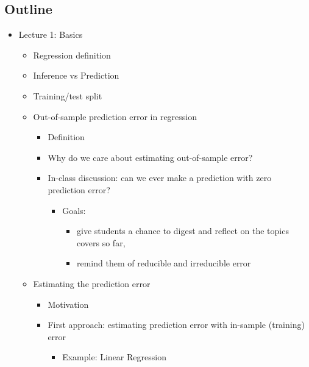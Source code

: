 \documentclass[
  letterpaper,
  DIV=11,
  numbers=noendperiod]{scrartcl}
\providecommand{\tightlist}{%
  \setlength{\itemsep}{0pt}\setlength{\parskip}{0pt}}\usepackage{longtable,booktabs,array}
\begin{document}
\subsection{Outline}\label{outline}

\begin{itemize}
\tightlist
\item
  Lecture 1: Basics

  \begin{itemize}
  \tightlist
  \item
    Regression definition
  \item
    Inference vs Prediction
  \item
    Training/test split
  \item
    Out-of-sample prediction error in regression

    \begin{itemize}
    \tightlist
    \item
      Definition
    \item
      Why do we care about estimating out-of-sample error?
    \item
      In-class discussion: can we ever make a prediction with zero
      prediction error?

      \begin{itemize}
      \tightlist
      \item
        Goals:

        \begin{itemize}
        \tightlist
        \item
          give students a chance to digest and reflect on the topics
          covers so far,
        \item
          remind them of reducible and irreducible error
        \end{itemize}
      \end{itemize}
    \end{itemize}
  \item
    Estimating the prediction error

    \begin{itemize}
    \tightlist
    \item
      Motivation
    \item
      First approach: estimating prediction error with in-sample
      (training) error

      \begin{itemize}
      \tightlist
      \item
        Example: Linear Regression


\end{itemize}
\end{itemize}
\end{itemize}
\end{itemize}
\end{document}
